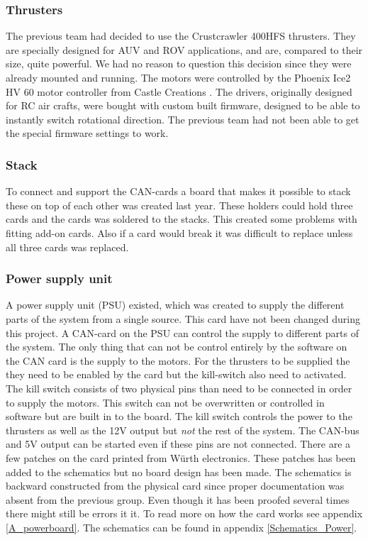 	\subsubsection{Thrusters} %
\noindent
The previous team had decided to use the Crustcrawler 400HFS thrusters\cite{thrusters}. They are specially designed for AUV and ROV applications, and are, compared to their size, quite powerful. We had no reason to question this decision since they were already mounted and running. The motors were controlled by the Phoenix Ice2 HV 60 motor controller from Castle Creations \cite{motor_drivers}. The drivers, originally designed for RC air crafts, were bought with custom built firmware, designed to be able to instantly switch rotational direction. The previous team had not been able to get the special firmware settings to work.
 
		\subsubsection{Stack}
	To connect and support the CAN-cards a board that makes it possible to stack these on top of each other was created last year. These holders could hold three cards and the cards was soldered to the stacks. This created some problems with fitting add-on cards. Also if a card would break it was difficult to replace unless all three cards was replaced. 
	
	\subsubsection{Power supply unit} %
A power supply unit (PSU) existed, which was created to supply the different parts of the system from a single source. This card have not been changed during this project. A CAN-card on the PSU can control the supply to different parts of the system. The only thing that can not be control entirely by the software on the CAN card is the supply to the motors. For the thrusters to be supplied the they need to be enabled by the card but the kill-switch also need to activated. The kill switch consists of two physical pins than need to be connected in order to supply the motors. This switch can not be overwritten or controlled in software but are built in to the board. The kill switch controls the power to the thrusters as well as the 12V output but \emph{not} the rest of the system. The CAN-bus and 5V output can be started even if these pins are not connected. There are a few patches on the card printed from Würth electronics. These patches has been added to the schematics but no board design has been made. The schematics is backward constructed from the physical card since proper documentation was absent from the previous group. Even though it has been proofed several times there might still be errors it it. To read more on how the card works see appendix \ref{A_powerboard}. The schematics can be found in appendix \ref{Schematics_Power}.

